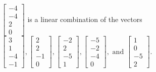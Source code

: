 \begin{exercise}
\begin{exerciseStatement}
  \end{exerciseStatement}
  \begin{exerciseAnswer}
   \(\left[\begin{array}{c}
-4 \\
-4 \\
2 \\
0
\end{array}\right]\) 
  	 is  
	a linear combination of the vectors \(\left[\begin{array}{c}
3 \\
1 \\
-4 \\
-1
\end{array}\right] , \left[\begin{array}{c}
2 \\
2 \\
-1 \\
0
\end{array}\right] , \left[\begin{array}{c}
-2 \\
2 \\
-5 \\
1
\end{array}\right] , \left[\begin{array}{c}
-5 \\
-2 \\
-4 \\
0
\end{array}\right] , \text{ and } \left[\begin{array}{c}
1 \\
0 \\
-5 \\
2
\end{array}\right]\).

	
  


  \end{exerciseAnswer}
\end{exercise}